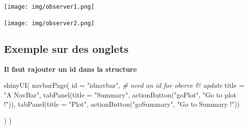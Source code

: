 \documentclass[
]{article}
\newenvironment{Shaded}{\begin{snugshade}}{\end{snugshade}}
\newcommand{\AttributeTok}[1]{\textcolor[rgb]{0.77,0.63,0.00}{#1}}
\newcommand{\CommentTok}[1]{\textcolor[rgb]{0.56,0.35,0.01}{\textit{#1}}}
\newcommand{\ControlFlowTok}[1]{\textcolor[rgb]{0.13,0.29,0.53}{\textbf{#1}}}
\newcommand{\DecValTok}[1]{\textcolor[rgb]{0.00,0.00,0.81}{#1}}
\newcommand{\FunctionTok}[1]{\textcolor[rgb]{0.00,0.00,0.00}{#1}}
\newcommand{\NormalTok}[1]{#1}
\newcommand{\OtherTok}[1]{\textcolor[rgb]{0.56,0.35,0.01}{#1}}
\newcommand{\SpecialCharTok}[1]{\textcolor[rgb]{0.00,0.00,0.00}{#1}}
\newcommand{\StringTok}[1]{\textcolor[rgb]{0.31,0.60,0.02}{#1}}
\begin{document}
\begin{Shaded}
\end{Shaded}

\texttt{[image: img/observer1.png]}

\texttt{[image: img/observer2.png]}

\hypertarget{exemple-sur-des-onglets}{%
\subsection{Exemple sur des onglets}\label{exemple-sur-des-onglets}}

\textbf{Il faut rajouter un id dans la structure}

\begin{Shaded}
\begin{Highlighting}[]
\FunctionTok{shinyUI}\NormalTok{(}
  \FunctionTok{navbarPage}\NormalTok{(}
    \AttributeTok{id =} \StringTok{"idnavbar"}\NormalTok{, }\CommentTok{\# need an id for oberve \& update}
    \AttributeTok{title =} \StringTok{"A NavBar"}\NormalTok{,}
    \FunctionTok{tabPanel}\NormalTok{(}\AttributeTok{title =} \StringTok{"Summary"}\NormalTok{,}
             \FunctionTok{actionButton}\NormalTok{(}\StringTok{"goPlot"}\NormalTok{, }\StringTok{"Go to plot !"}\NormalTok{)),}
    \FunctionTok{tabPanel}\NormalTok{(}\AttributeTok{title =} \StringTok{"Plot"}\NormalTok{,}
             \FunctionTok{actionButton}\NormalTok{(}\StringTok{"goSummary"}\NormalTok{, }\StringTok{"Go to Summary !"}\NormalTok{))}
    
\NormalTok{  )}
\NormalTok{)}
\end{Highlighting}
\end{Shaded}
\end{document}
